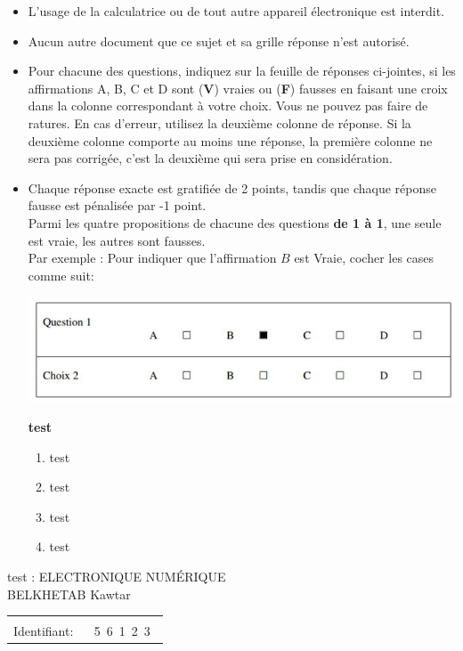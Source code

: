 \documentclass{book}%
\begin{document}
\begin{itemize}%
\item%
L'usage de la calculatrice ou de tout autre appareil électronique est interdit.%
\item%
Aucun autre document que ce sujet et sa grille réponse n'est autorisé.%
\item%
Pour chacune des questions, indiquez sur la feuille de réponses ci-jointes, si les affirmations A, B, C et D sont (\textbf{V}) vraies ou (\textbf{F}) fausses en faisant une croix dans la colonne correspondant à votre choix. Vous ne pouvez pas faire de ratures. En cas d'erreur, utilisez la deuxième colonne de réponse. Si la deuxième colonne comporte au moins une réponse, la première colonne ne sera pas corrigée, c'est la deuxième qui sera prise en considération.%
\item%
Chaque réponse exacte est gratifiée de 2 points, tandis que chaque réponse fausse est pénalisée par -1 point. \\ 	Parmi les quatre propositions de chacune des questions \textbf{de 1 à 1}, une seule est vraie, les autres sont fausses. \\ 	Par exemple : Pour indiquer que l'affirmation $B$ est Vraie, cocher les cases comme suit:  \\ \begin{center}	\includegraphics[scale=0.8]{reponses.png} \end{center}%
\thispagestyle{empty}%
\begin{exercise}%
\textbf{test }%
\begin{enumerate}[label=\textbf{\Alph*. }]%
\item%
test%
\item%
test%
\item%
test%
\item%
test%
\end{enumerate}%
\end{exercise}%
\end{itemize}%
\newpage%
\thispagestyle{empty}%
test : ELECTRONIQUE NUMÉRIQUE $\qquad \qquad \qquad \qquad \qquad \qquad \qquad \qquad$ BELKHETAB Kawtar%
\begin{flushright}%
\begin{tabular}{|l|}%
\hline%
 \\%
\thispagestyle{empty}%
Identifiant: $\quad$ {\Large 5~6~1~2~3~}%
 \\%
\hline%
\end{tabular}%
\end{flushright}%
\end{document}
